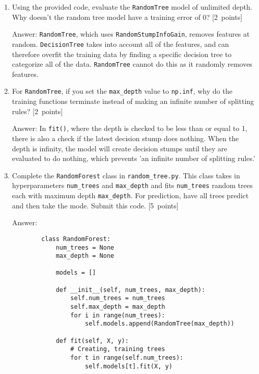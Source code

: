 \documentclass{article}
\newcommand{\blu}[1]{{\textcolor{blu}{#1}}}
\newenvironment{answer}{\par\begingroup\color{gre}Answer: }{\endgroup}
\let\ask\blu
\newcommand\pts[1]{\textcolor{pointscolour}{[#1~points]}}
\begin{document}
    \begin{enumerate}
        \item Using the provided code, evaluate the \texttt{RandomTree} model of unlimited depth. \ask{Why doesn't the random tree model have a training error of 0?} \pts{2}
        \begin{answer}
        \texttt{RandomTree}, which uses \texttt{RandomStumpInfoGain}, removes features at random. \texttt{DecisionTree} takes into account all of the features, and can therefore overfit the training data by finding a specific decision tree to categorize all of the data. \texttt{RandomTree} cannot do this as it randomly removes features.
        \end{answer}
        \item For \texttt{RandomTree}, if you set the \texttt{max\_depth} value to \texttt{np.inf}, \ask{why do the training functions terminate instead of making an infinite number of splitting rules?} \pts{2}
        \begin{answer}
        In \texttt{fit()}, where the depth is checked to be less than or equal to 1, there is also a check if the latest decision stump does nothing. When the depth is infinity, the model will create decision stumps until they are evaluated to do nothing, which prevents 'an infinite number of splitting rules.'
        \end{answer}
        \item Complete the \texttt{RandomForest} class in \texttt{random\string_tree.py}. This class takes in hyperparameters \texttt{num\string_trees} and \texttt{max\string_depth} and
        fits \texttt{num\string_trees} random trees each with maximum depth \texttt{max\string_depth}. For prediction, have all trees predict and then take the mode. \ask{Submit this code.} \pts{5}
        \begin{answer}
        \begin{verbatim}
        class RandomForest:
            num_trees = None
            max_depth = None

            models = []

            def __init__(self, num_trees, max_depth):
                self.num_trees = num_trees
                self.max_depth = max_depth
                for i in range(num_trees):
                    self.models.append(RandomTree(max_depth))

            def fit(self, X, y):
                # Creating, training trees
                for t in range(self.num_trees):
                    self.models[t].fit(X, y)


\end{verbatim}
\end{answer}
\end{enumerate}
\end{document}
